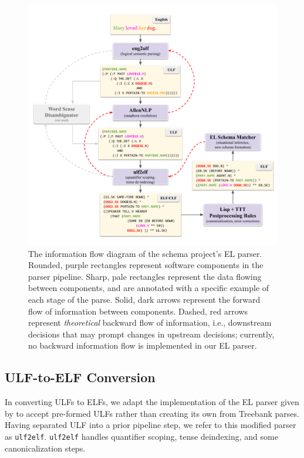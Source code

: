\begin{figure}
    \centering
    \includegraphics[width=\columnwidth]{CH2_el/parserstages}
    \caption{The information flow diagram of the schema project's EL parser. Rounded, purple rectangles represent software components in the parser pipeline. Sharp, pale rectangles represent the data flowing between components, and are annotated with a specific example of each stage of the parse. Solid, dark arrows represent the forward flow of information between components. Dashed, red arrows represent \textit{theoretical} backward flow of information, i.e., downstream decisions that may prompt changes in upstream decisions; currently, no backward information flow is implemented in our EL parser.}
    \label{fig:my_label}
\end{figure}

\subsection{ULF-to-ELF Conversion}
In converting ULFs to ELFs, we adapt the implementation of the EL parser given by \citet{schubert-2014-treebank} to accept pre-formed ULFs rather than creating its own from Treebank parses. Having separated ULF into a prior pipeline step, we refer to this modified parser as \texttt{ulf2elf}. \texttt{ulf2elf} handles quantifier scoping, tense deindexing, and some canonicalization steps.

